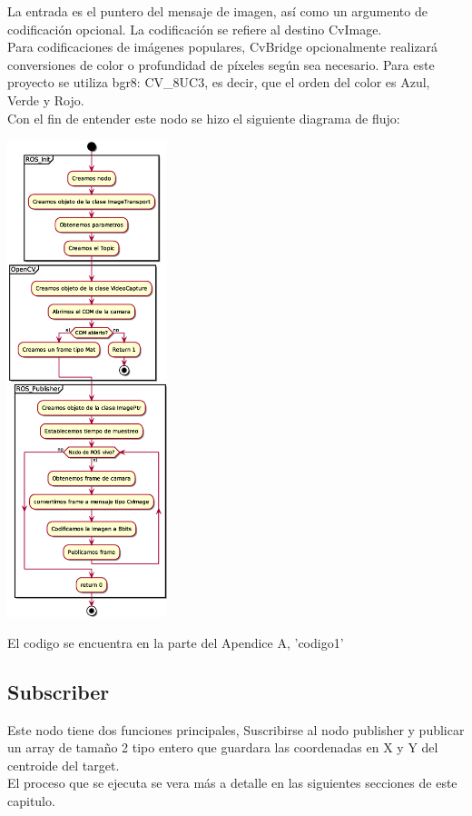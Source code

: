 La entrada es el puntero del mensaje de imagen, así como un argumento de 
codificación opcional. La codificación se refiere al destino CvImage.\\
Para codificaciones de imágenes populares, CvBridge opcionalmente realizará 
conversiones de color o profundidad de píxeles según sea necesario. Para este proyecto
se utiliza bgr8: CV\_8UC3, es decir, que el orden del color es Azul, Verde y Rojo.\\
Con el fin de entender este nodo se hizo el siguiente diagrama de flujo:
\begin{center}
    \includegraphics[width=0.35\textwidth]{Capitulo4/publisher.eps}       
    \label{Fig5}
\end{center}
El codigo se encuentra en la parte del Apendice A, 'codigo1'

\subsection{Subscriber}
Este nodo tiene dos funciones principales, Suscribirse al nodo publisher y publicar
un array de tamaño 2 tipo entero que guardara las coordenadas en X y Y del centroide
del target.\\
El proceso que se ejecuta se vera más a detalle en las siguientes secciones de este
capitulo.

